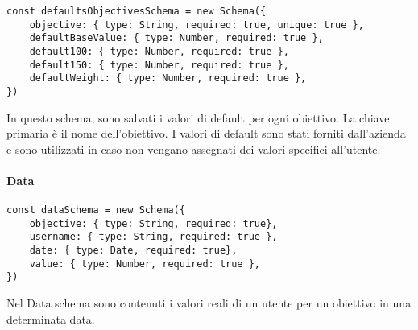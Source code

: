 \begin{verbatim}
const defaultsObjectivesSchema = new Schema({
    objective: { type: String, required: true, unique: true },
    defaultBaseValue: { type: Number, required: true },
    default100: { type: Number, required: true },
    default150: { type: Number, required: true },
    defaultWeight: { type: Number, required: true },
})
\end{verbatim}

In questo schema, sono salvati i valori di default per ogni obiettivo. La chiave primaria è il nome dell'obiettivo.
I valori di default sono stati forniti dall'azienda e sono utilizzati in caso non vengano assegnati dei valori 
specifici all'utente.

\paragraph{Data}

\begin{verbatim}
const dataSchema = new Schema({
    objective: { type: String, required: true},
    username: { type: String, required: true },
    date: { type: Date, required: true},
    value: { type: Number, required: true },
})
\end{verbatim}

Nel Data schema sono contenuti i valori reali di un utente per un obiettivo in una determinata data.